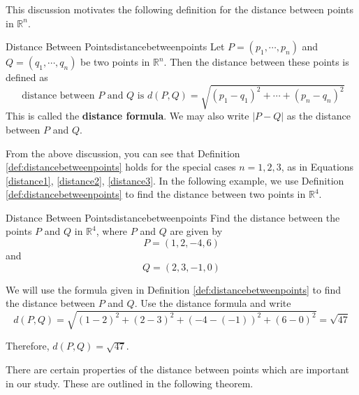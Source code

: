 This discussion motivates the following definition for the distance between points in $\mathbb{R}^n$. 

\begin{definition}{Distance Between Points}{distancebetweenpoints}
Let $P=\left( p_{1},\cdots ,p_{n}\right) $ and 
$Q=\left( q_{1},\cdots ,q_{n}\right) $ be two points in 
$\mathbb{R}^{n}$. Then the distance
between these points is defined as
\begin{equation*}
\text{ distance between }P\text{ and } Q\text{ is } 
d( P, Q ) =\sqrt{ (p_1-q_1)^2 + \cdots + (p_n-q_n)^2}
\end{equation*}
This is called the \textbf{distance formula}. We may also write $\left\vert P - Q \right\vert $ as the distance between $P$ and $Q$.
\end{definition}

From the above discussion, you can see that Definition \ref{def:distancebetweenpoints} holds for the special cases $n=1,2,3$, as in 
Equations \ref{distance1}, \ref{distance2}, \ref{distance3}. 
In the following example, we use Definition \ref{def:distancebetweenpoints} to find the distance between two points in
$\mathbb{R}^4$.

\begin{example}{Distance Between Points}{distancebetweenpoints}
Find the distance between the points $P$ and $Q$ in $\mathbb{R}^{4}$,
where $P$ and $Q$ are given by 
\begin{equation*}
P=\left( 1,2,-4,6\right)
\end{equation*}
and
\begin{equation*}
Q=\left( 2,3,-1,0\right)
\end{equation*}
\end{example}

\begin{solution}
We will use the formula given in Definition \ref{def:distancebetweenpoints} to find the distance between
$P$ and $Q$. 
Use the distance formula and write
\begin{equation*}
d(P,Q)= \sqrt{ \left( 1-2\right) ^{2}+\left( 2-3\right)
^{2}+\left( -4-\left( -1\right) \right) ^{2}+\left( 6-0\right)^{2}} = \sqrt{47}
\end{equation*}

Therefore, $d( P,Q) =
\sqrt{47}.$

\end{solution}

There are certain properties of the distance between points which are important in our study.
These are outlined in the following theorem.

